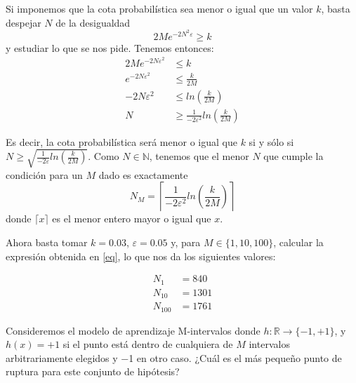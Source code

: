 \documentclass[a4paper, 11pt]{article}
\begin{document}
    \begin{solucion}
        Si imponemos que la cota probabilística sea menor o igual que un valor $k$, basta despejar $N$ de la desigualdad
        \[
        2 M e^{-2 N^2 \varepsilon} \geq k
        \]
        y estudiar lo que se nos pide. Tenemos entonces:
        \begin{align*}
            2 M e^{-2 N \varepsilon^2} &\leq k \\
            e^{-2 N \varepsilon^2} &\leq \frac{k}{2M} \\
            -2 N \varepsilon^2 &\leq ln(\frac{k}{2M}) \\
            N &\geq \frac{1}{-2\varepsilon^2} ln(\frac{k}{2M})
        \end{align*}

        Es decir, la cota probabilística será menor o igual que $k$ si y sólo si $N \geq \sqrt{\frac{1}{-2\varepsilon} ln(\frac{k}{2M})}$. Como $N \in \mathbb{N}$, tenemos que el menor $N$ que cumple la condición para un $M$ dado es exactamente
        \begin{equation}
            N_M = \left\lceil \frac{1}{-2\varepsilon^2} ln\left(\frac{k}{2M}\right) \right\rceil
            \label{eq}
        \end{equation}
        donde $\lceil x \rceil$ es el menor entero mayor o igual que $x$.

        Ahora basta tomar $k = 0.03$, $\varepsilon = 0.05$ y, para $M \in \{1, 10, 100\}$, calcular la expresión obtenida en \ref{eq}, lo que nos da los siguientes valores:

        \begin{align*}
            N_1 &= 840 \\
            N_{10} &= 1301 \\
            N_{100} &= 1761
        \end{align*}
    \end{solucion}


    \begin{ejercicio}
        Consideremos el modelo de aprendizaje \guillemotleft M-intervalos \guillemotright donde $h \colon \mathbb{R} \to \{−1, +1\}$, y $h(x) = +1$ si el punto está dentro de cualquiera de $M$ intervalos arbitrariamente elegidos y −1 en otro caso. ¿Cuál es el más pequeño punto de ruptura para este conjunto de hipótesis?
    \end{ejercicio}
\end{document}
